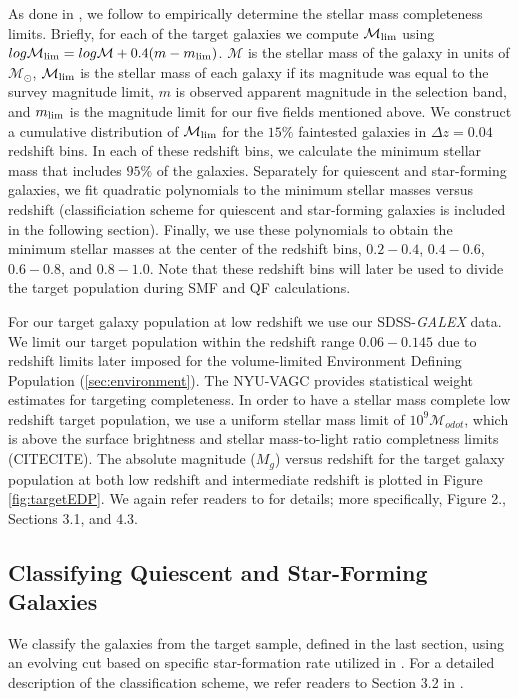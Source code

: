 \documentclass{emulateapj}
\begin{document}
As done in \cite{Moustakas:2013aa}, we follow \cite{Pozzetti:2010aa} to empirically determine the stellar mass completeness limits.
Briefly, for each of the target galaxies we compute $\mathcal{M}_{\rm{lim}}$ using $log \mathcal{M}_{\rm{lim}} = log \mathcal{M} + 0.4 ( m - m_{\rm{lim}})$.
$\mathcal{M}$ is the stellar mass of the galaxy in units of $\mathcal{M_{\odot}}$, $\mathcal{M}_{\rm{lim}}$ is the stellar mass of each galaxy if its magnitude was 
equal to the survey magnitude limit, $m$ is observed apparent magnitude in the selection band, and $m_{\rm{lim}}$ is the magnitude limit for our five fields mentioned above.
We construct a cumulative distribution of $\mathcal{M}_{\rm{lim}}$ for the $15\%$ faintested galaxies in $\Delta z=0.04$ redshift bins.
In each of these redshift bins, we calculate the minimum stellar mass that includes $95 \%$ of the galaxies.
Separately for quiescent and star-forming galaxies, we fit quadratic polynomials to the minimum stellar masses versus redshift (classificiation scheme for quiescent 
and star-forming galaxies is included in the following section).
Finally, we use these polynomials to obtain the minimum stellar masses at the center of the redshift bins, $0.2-0.4$, $0.4-0.6$, $0.6-0.8$, and $0.8-1.0$.
Note that these redshift bins will later be used to divide the target population during SMF and QF calculations.

For our target galaxy population at low redshift we use our SDSS-{\em GALEX} data. 
We limit our target population within the redshift range $0.06-0.145$ due to redshift limits later imposed for the volume-limited Environment Defining Population (\ref{sec:environment}).
The NYU-VAGC provides statistical weight estimates for targeting completeness.
In order to have a stellar mass complete low redshift target population, we use a uniform stellar mass limit of $10^9 \mathcal{M}_{odot}$, which is above the surface 
brightness and stellar mass-to-light ratio completness limits (CITECITE).
The absolute magnitude ($M_g$) versus redshift for the target galaxy population at both low redshift and intermediate redshift is plotted in Figure \ref{fig:targetEDP}.
We again refer readers to \cite{Moustakas:2013aa} for details; more specifically, Figure 2., Sections 3.1, and 4.3. 

\subsection{Classifying Quiescent and Star-Forming Galaxies} \label{sec:sfq}
We classify the galaxies from the target sample, defined in the last section, using an evolving cut based on specific star-formation rate utilized in \cite{Moustakas:2013aa}.
For a detailed description of the classification scheme, we refer readers to Section 3.2 in \cite{Moustakas:2013aa}.
\end{document}
